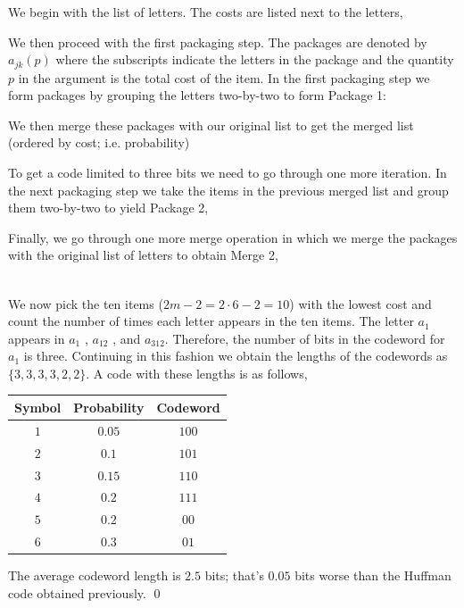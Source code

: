 We begin with the list of letters. The costs are listed next to the letters,

\bee
[a_1(0.05), a2(0.1), a3(0.15), a4(0.2), a5(0.2), a6(0.3)]
\eee

We then proceed with the first packaging step. The packages are denoted by $a_{jk}(p)$ where the subscripts indicate the letters in the package and the quantity $p$ in the argument is the total cost of the item. In the first packaging step we form packages by grouping the letters two-by-two to form Package 1:

\bee
[a_{12}(0.15), a_{34}(0.35), a_{56}(0.5)]
\eee

We then merge these packages with our original list to get the merged list (ordered by cost; i.e. probability)

\bee
[a_1(0.05), a2(0.1), a3(0.15), a_{12}(0.15), a4(0.2), a5(0.2), a_6(0.3), a_{34}(0.35), a_{56}(0.5)]
\eee

To get a code limited to three bits we need to go through one more iteration. In the next packaging step we take the items in the previous merged list and group them two-by-two to yield Package 2,

\bee
[a_{12}(0.15), a_{312}(0.3), a_{45}(0.4), a_{634}(0.65)]
\eee

Finally, we go through one more merge operation in which we merge the packages with the original list of letters to obtain Merge 2,

\begin{align*}
    [& a_1(0.05), a2(0.1), a3(0.15), a_{12}(0.15), a4(0.2), a5(0.2), a6(0.3), \\ & a_{312}(0.3), a_{34}(0.35), a_{45}(0.4), a_{56}(0.5), a_{634}(0.65)]    
\end{align*}


We now pick the ten items ($2m-2 = 2 \cdot 6 - 2 = 10$) with the lowest cost and count the number of times each letter appears in the ten items. The letter $a_1$ appears in $a_1$ , $a_{12}$ , and $a_{312}$. Therefore, the number of bits in the codeword for $a_1$ is three. Continuing in this fashion we obtain the lengths of the codewords as $\{3, 3, 3, 3, 2, 2\}$. A code with these lengths is as follows,

\vspace{3mm}

\begin{tabular}{cc|c}
    Symbol & Probability & Codeword \\ \hline
    $1$ & $0.05$ & $100$ \\
    $2$ & $0.1$ & $101$ \\
    $3$ & $0.15$ & $110$ \\
    $4$ & $0.2$ & $111$ \\
    $5$ & $0.2$ & $00$ \\
    $6$ & $0.3$ & $01$
\end{tabular}

\vspace{3mm}

The average codeword length is $2.5$ bits; that's $0.05$ bits worse than the Huffman code obtained previously. \qed


